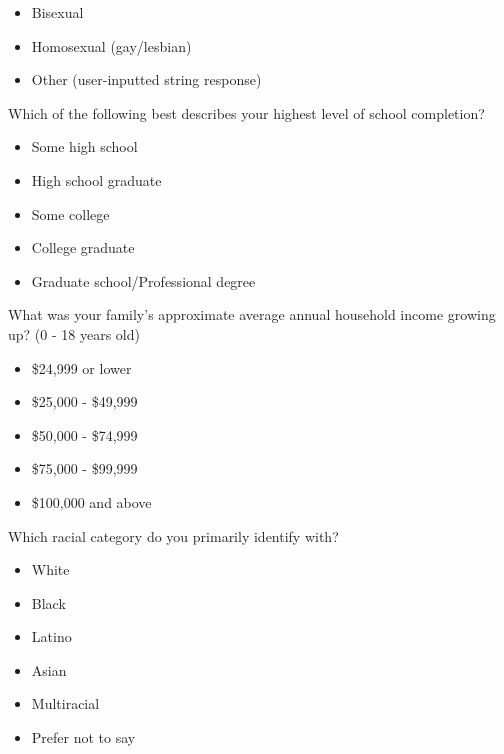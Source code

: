 \documentclass[twoside]{report}
\begin{document}
\begin{multicols*}{2}
\begin{multicols}{2}
\begin{itemize}
\item
  Bisexual
\item
  Homosexual (gay/lesbian)
\item
  Other (user-inputted string response)
\end{itemize}

Which of the following best describes your highest level of school
completion?

\begin{itemize}
\item
  Some high school
\end{itemize}

\begin{itemize}
\item
  High school graduate
\item
  Some college
\item
  College graduate
\item
  Graduate school/Professional degree
\end{itemize}

What was your family's approximate average annual household income
growing up? (0 - 18 years old)

\begin{itemize}
\item
  \$24,999 or lower
\end{itemize}

\begin{itemize}
\item
  \$25,000 - \$49,999
\item
  \$50,000 - \$74,999
\item
  \$75,000 - \$99,999
\item
  \$100,000 and above
\end{itemize}

Which racial category do you primarily identify with?

\begin{itemize}
\item
  White
\end{itemize}

\begin{itemize}
\item
  Black
\item
  Latino
\item
  Asian
\item
  Multiracial
\item
  Prefer not to say
\end{itemize}


\end{multicols}
\end{multicols*}
\end{document}
